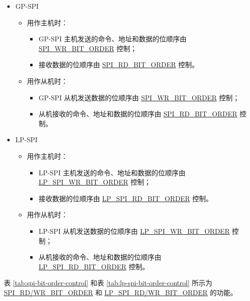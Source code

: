 \documentclass[main\_\_CN.tex]{subfiles}
\begin{document}
\begin{itemize}
    \item GP-SPI
    \begin{itemize}
        \item 用作主机时：
        \begin{itemize}
            \item GP-SPI 主机发送的命令、地址和数据的位顺序由 \hyperref[fielddesc:SPIWRBITORDER]{SPI\_WR\_BIT\_ORDER} 控制；
            \item 接收数据的位顺序由 \hyperref[fielddesc:SPIRDBITORDER]{SPI\_RD\_BIT\_ORDER} 控制。
        \end{itemize}
        \item 用作从机时：
        \begin{itemize}
            \item GP-SPI 从机发送数据的位顺序由 \hyperref[fielddesc:SPIWRBITORDER]{SPI\_WR\_BIT\_ORDER} 控制；
            \item 从机接收的命令、地址和数据的位顺序由 \hyperref[fielddesc:SPIRDBITORDER]{SPI\_RD\_BIT\_ORDER} 控制。
        \end{itemize}
    \end{itemize}
    \item LP-SPI
    \begin{itemize}
        \item 用作主机时：
        \begin{itemize}
            \item LP-SPI 主机发送的命令、地址和数据的位顺序由 \hyperref[fielddesc:LPSPIWRBITORDER]{LP\_SPI\_WR\_BIT\_ORDER} 控制；
            \item 接收数据的位顺序由 \hyperref[fielddesc:LPSPIRDBITORDER]{LP\_SPI\_RD\_BIT\_ORDER} 控制。
        \end{itemize}
        \item 用作从机时：
        \begin{itemize}
            \item LP-SPI 从机发送数据的位顺序由 \hyperref[fielddesc:LPSPIWRBITORDER]{LP\_SPI\_WR\_BIT\_ORDER} 控制；
            \item 从机接收的命令、地址和数据的位顺序由 \hyperref[fielddesc:LPSPIRDBITORDER]{LP\_SPI\_RD\_BIT\_ORDER} 控制。
        \end{itemize}
    \end{itemize}
\end{itemize}
表 \ref{tab:spi-bit-order-control} 和表 \ref{tab:lp-spi-bit-order-control} 所示为 \hyperref[fielddesc:SPIRDBITORDER]{SPI\_RD/WR\_BIT\_ORDER} 和 \hyperref[fielddesc:LPSPIRDBITORDER]{LP\_SPI\_RD/WR\_BIT\_ORDER} 的功能。
\end{document}
